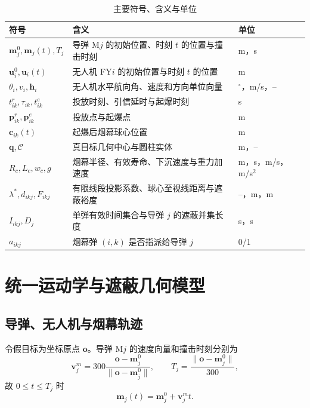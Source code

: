 \documentclass[UTF8,a4paper,12pt,fontset=windows]{ctexart}
\newcommand{\thead}[1]{{\bfseries\boldmath #1}}
\begin{document}
\begin{table}[!htbp]
\centering
\caption{主要符号、含义与单位}
\small
\begin{tabularx}{\textwidth}{p{3.0cm}Yp{2.0cm}}
\toprule
\thead{符号} & \thead{含义} & \thead{单位}\\
\midrule
$\bm m_j^0,\bm m_j(t),T_j$ & 导弹 M$j$ 的初始位置、时刻 $t$ 的位置与撞击时刻 & m，s\\
$\bm u_i^0,\bm u_i(t)$ & 无人机 FY$i$ 的初始位置与时刻 $t$ 的位置 & m\\
$\theta_i,v_i,\bm h_i$ & 无人机水平航向角、速度和方向单位向量 & $^\circ$，m/s，--\\
$t_{ik}^{r},\tau_{ik},t_{ik}^{e}$ & 投放时刻、引信延时与起爆时刻 & s\\
$\bm p_{ik}^{r},\bm p_{ik}^{e}$ & 投放点与起爆点 & m\\
$\bm c_{ik}(t)$ & 起爆后烟幕球心位置 & m\\
$\bm q,\mathcal C$ & 真目标几何中心与圆柱实体 & m，--\\
$R_c,L_c,w_c,g$ & 烟幕半径、有效寿命、下沉速度与重力加速度 & m，s，m/s，m/s$^2$\\
$\lambda^*,d_{ikj},F_{ikj}$ & 有限线段投影系数、球心至视线距离与遮蔽裕度 & --，m，m\\
$I_{ikj},D_j$ & 单弹有效时间集合与导弹 $j$ 的遮蔽并集长度 & s，s\\
$a_{ikj}$ & 烟幕弹 $(i,k)$ 是否指派给导弹 $j$ & 0/1\\
\bottomrule
\end{tabularx}
\end{table}

\section{统一运动学与遮蔽几何模型}

\subsection{导弹、无人机与烟幕轨迹}

令假目标为坐标原点 $\bm o$。导弹 M$j$ 的速度向量和撞击时刻分别为
\begin{equation}
\bm v_j^m=300\frac{\bm o-\bm m_j^0}{\|\bm o-\bm m_j^0\|},\qquad
T_j=\frac{\|\bm o-\bm m_j^0\|}{300},
\label{eq:missile-velocity}
\end{equation}
故 $0\leq t\leq T_j$ 时
\begin{equation}
\bm m_j(t)=\bm m_j^0+\bm v_j^m t.
\label{eq:missile-position}
\end{equation}
\end{document}
